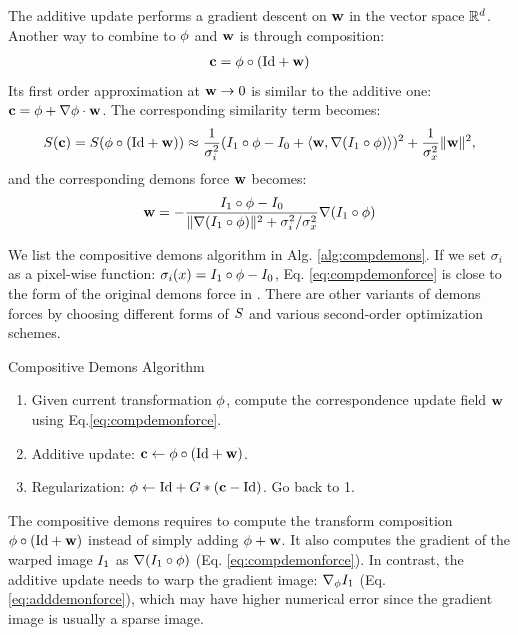 \documentclass[letterpaper,12pt]{article}
\begin{document}
The additive update performs a gradient descent on $\mathbf{w}$ in the vector
space $\mathbb{R}^d$. Another way to combine to $\phi$ and $\mathbf{w}$ is through composition:
\begin{align}
\mathbf{c} = \phi \circ \left( \text{Id} + \mathbf{w} \right)
\label{eq:demoncomp}
\end{align}
Its first order approximation at $\mathbf{w} \to 0$ is similar to the additive one: $\mathbf{c} = \phi + \nabla\phi\cdot\mathbf{w}$. The corresponding similarity term becomes:
\begin{align}
S(\mathbf{c}) = S(\phi \circ (\text{Id} + \mathbf{w}) ) \approx
\frac{1}{\sigma_i^2} ( I_1 \circ \phi - I_0 + \langle \mathbf{w}, \nabla (I_1 \circ \phi ) \rangle )^2 
+ \frac{1}{\sigma_x^2} \| \mathbf{w} \|^2,
\label{eq:compdemonssim}
\end{align}
and the corresponding demons force $\mathbf{w}$ becomes:
\begin{align}
\mathbf{w} = -\frac{I_1 \circ \phi - I_0 }
           {\|\nabla (I_1 \circ \phi )\|^2 + {\sigma_i^2}/{\sigma_x^2}}
           \nabla (I_1 \circ \phi )
\label{eq:compdemonforce}           
\end{align}

We list the compositive demons algorithm in Alg. \ref{alg:compdemons}. 
If we set $\sigma_i$ as a pixel-wise function: $\sigma_i(x) = I_1 \circ \phi - I_0 $, Eq. \ref{eq:compdemonforce} is close to the form of the original demons force in \cite{Thirion98}. There are other variants of demons forces by choosing different forms of $S$ and various second-order optimization schemes. 

\begin{algorithm}
\caption{Compositive Demons Algorithm}
\label{alg:compdemons}
\begin{enumerate}
\item{Given current transformation $\phi$, compute the correspondence update field $\mathbf{w}$ using Eq.\ref{eq:compdemonforce}. 
}
\item{Additive update: $\mathbf{c} \leftarrow \phi \circ \left( \text{Id} + \mathbf{w} \right)$.
}
\item{Regularization: $\phi \leftarrow \text{Id} + {G} \ast (\mathbf{c} - \text{Id})$. Go back to 1.
}
\end{enumerate}
\end{algorithm}

The compositive demons requires to compute the transform composition $\phi \circ \left( \text{Id} + \mathbf{w} \right)$ instead of simply adding $\phi + \mathbf{w}$. It also computes the gradient of the warped image $I_1$ as $\nabla (I_1 \circ \phi)$ (Eq. \ref{eq:compdemonforce}). In contrast, the additive update needs to warp the gradient image: $\nabla_{\phi}I_1$ (Eq. \ref{eq:adddemonforce}), which may have higher numerical error since the gradient image is usually a sparse image.
\end{document}
